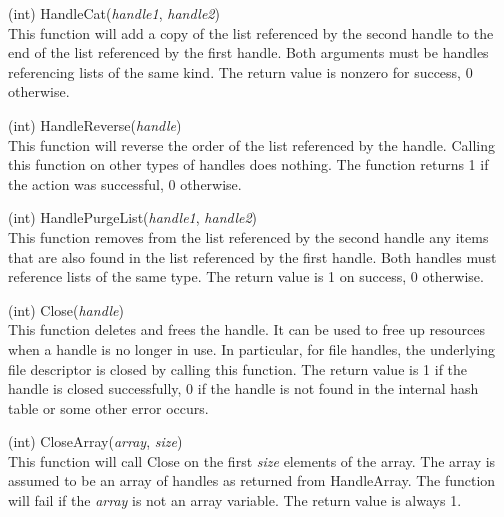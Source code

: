 \begin{description}
\item{(int) \vt HandleCat({\it handle1\/}, {\it handle2\/})}\\
This function will add a copy of the list referenced by the second
handle to the end of the list referenced by the first handle.  Both
arguments must be handles referencing lists of the same kind.  The
return value is nonzero for success, 0 otherwise.

\item{(int) \vt HandleReverse({\it handle\/})}\\
This function will reverse the order of the list referenced by the
handle.  Calling this function on other types of handles does nothing. 
The function returns 1 if the action was successful, 0 otherwise.

\item{(int) \vt HandlePurgeList({\it handle1\/}, {\it handle2\/})}\\
This function removes from the list referenced by the second handle
any items that are also found in the list referenced by the first
handle.  Both handles must reference lists of the same type.  The
return value is 1 on success, 0 otherwise.

\item{(int) \vt Close({\it handle\/})}\\
This function deletes and frees the handle.  It can be used to free up
resources when a handle is no longer in use.  In particular, for file
handles, the underlying file descriptor is closed by calling this
function.  The return value is 1 if the handle is closed successfully,
0 if the handle is not found in the internal hash table or some other
error occurs.

\item{(int) \vt CloseArray({\it array\/}, {\it size\/})}\\
This function will call {\vt Close} on the first {\it size} elements
of the array.  The array is assumed to be an array of handles as
returned from {\vt HandleArray}.  The function will fail if the {\it
array} is not an array variable.  The return value is always 1. 

\end{description}


